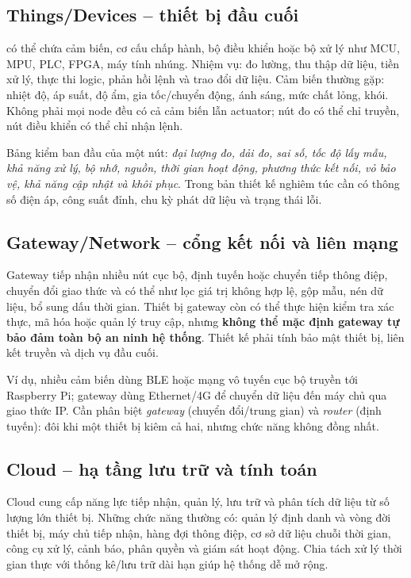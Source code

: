 \subsection{Things/Devices -- thiết bị đầu cuối}
 có thể chứa cảm biến, cơ cấu chấp hành, bộ điều khiển hoặc bộ xử lý như MCU, MPU, PLC, FPGA, máy tính nhúng. Nhiệm vụ: đo lường, thu thập dữ liệu, tiền xử lý, thực thi logic, phản hồi lệnh và trao đổi dữ liệu. Cảm biến thường gặp: nhiệt độ, áp suất, độ ẩm, gia tốc/chuyển động, ánh sáng, mức chất lỏng, khói. Không phải mọi node đều có cả cảm biến lẫn actuator; nút đo có thể chỉ truyền, nút điều khiển có thể chỉ nhận lệnh.

Bảng kiểm ban đầu của một nút: \emph{đại lượng đo, dải đo, sai số, tốc độ lấy mẫu, khả năng xử lý, bộ nhớ, nguồn, thời gian hoạt động, phương thức kết nối, vỏ bảo vệ, khả năng cập nhật và khôi phục}. Trong bản thiết kế nghiêm túc cần có thông số điện áp, công suất đỉnh, chu kỳ phát dữ liệu và trạng thái lỗi.

\subsection{Gateway/Network -- cổng kết nối và liên mạng}
Gateway tiếp nhận nhiều nút cục bộ, định tuyến hoặc chuyển tiếp thông điệp, chuyển đổi giao thức và có thể  như lọc giá trị không hợp lệ, gộp mẫu, nén dữ liệu, bổ sung dấu thời gian. Thiết bị gateway còn có thể thực hiện kiểm tra xác thực, mã hóa hoặc quản lý truy cập, nhưng \textbf{không thể mặc định gateway tự bảo đảm toàn bộ an ninh hệ thống}. Thiết kế phải tính bảo mật thiết bị, liên kết truyền và dịch vụ đầu cuối.

Ví dụ, nhiều cảm biến dùng BLE hoặc mạng vô tuyến cục bộ truyền tới Raspberry Pi; gateway dùng Ethernet/4G để chuyển dữ liệu đến máy chủ qua giao thức IP. Cần phân biệt \emph{gateway} (chuyển đổi/trung gian) và \emph{router} (định tuyến): đôi khi một thiết bị kiêm cả hai, nhưng chức năng không đồng nhất.

\subsection{Cloud -- hạ tầng lưu trữ và tính toán}
Cloud cung cấp năng lực tiếp nhận, quản lý, lưu trữ và phân tích dữ liệu từ số lượng lớn thiết bị. Những chức năng thường có: quản lý định danh và vòng đời thiết bị, máy chủ tiếp nhận, hàng đợi thông điệp, cơ sở dữ liệu chuỗi thời gian, công cụ xử lý, cảnh báo, phân quyền và giám sát hoạt động. Chia tách xử lý thời gian thực với thống kê/lưu trữ dài hạn giúp hệ thống dễ mở rộng.

